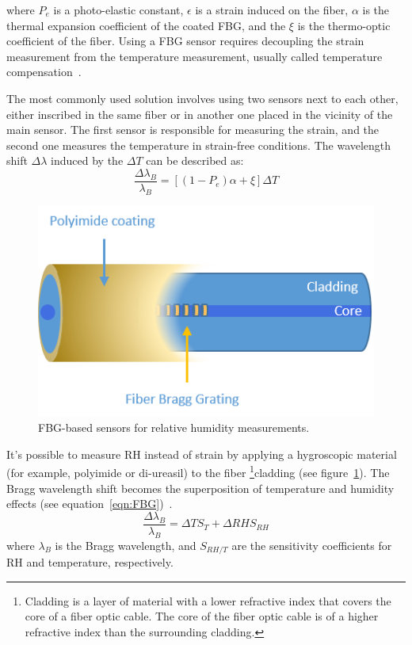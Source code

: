 where $P_{e}$ is a photo-elastic constant, $\epsilon$ is a strain induced on the fiber, $\alpha$ is the thermal expansion coefficient of the coated \gls{FBG}, and the $\xi$ is the thermo-optic coefficient of the fiber. Using a \gls{FBG} sensor requires decoupling the strain measurement from the temperature measurement, usually called temperature compensation~\cite{Yun-Jiang_Rao_1997}. 

The most commonly used solution involves using two sensors next to each other, either inscribed in the same fiber or in another one placed in the vicinity of the main sensor. The first sensor is responsible for measuring the strain, and the second one measures the temperature in strain-free conditions. The wavelength shift $\Delta \lambda$ induced by the $\Delta T$ can be described as:
\begin{equation}
    \frac{\Delta\lambda_{B}}{\lambda_{B}}=\left [(1-P_{e}) \alpha + \xi  \right ] \Delta T
\end{equation}


\begin{figure}[!h]
\centering
\includegraphics[width=0.45\columnwidth]{Chapter5/images/Picture1.png}
\caption{FBG-based sensors for relative humidity measurements.}
\label{fig:fbg_scheme}
\end{figure}


It's possible to measure RH instead of strain by applying a hygroscopic material (for example, polyimide or di-ureasil) to the fiber \footnote{Cladding is a layer of material with a lower refractive index that covers the core of a fiber optic cable. The core of the fiber optic cable is of a higher refractive index than the surrounding cladding.}{cladding} (see figure~\ref{fig:fbg_scheme}). The Bragg wavelength shift becomes the superposition of temperature and humidity effects (see equation~\ref{eqn:FBG})~\cite{Kronenberg:02, YEO_PI}. 
                             \begin{equation}\label{eqn:FBG}
                                    \frac{\Delta\lambda_{B}}{\lambda_{B}}=\Delta TS_{T}+\Delta RHS_{RH}
                            \end{equation}
                            where $\lambda_{B}$ is the Bragg wavelength, and $S_{RH/T}$ are the sensitivity coefficients for RH and temperature, respectively. 

